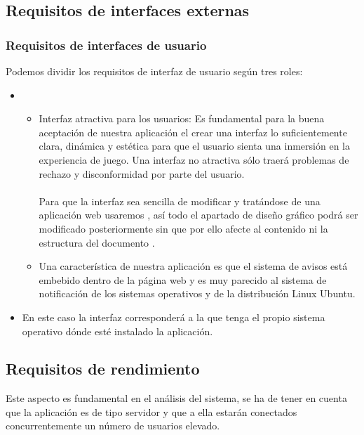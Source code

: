 \subsection{Requisitos de interfaces externas}
\subsubsection{Requisitos de interfaces de usuario}
Podemos dividir los requisitos de interfaz de usuario según tres roles:

\begin{itemize}
\item {}
  \begin{itemize}
  \item Interfaz atractiva para los usuarios: Es fundamental para la buena
    aceptación de nuestra aplicación el crear una interfaz lo suficientemente
    clara, dinámica y estética para que el usuario sienta una inmersión en la
    experiencia de juego. Una interfaz no atractiva sólo traerá problemas de
    rechazo y disconformidad por parte del usuario.\\\\
    Para que la interfaz sea sencilla de modificar y tratándose de una
    aplicación web usaremos , así todo el apartado
    de diseño gráfico podrá ser modificado posteriormente sin que por ello
    afecte al contenido ni la estructura del documento .
  \item Una característica de nuestra aplicación es que el sistema de avisos
    está embebido dentro de la página web y es muy parecido al sistema de
    notificación de los sistemas operativos  y de la \cursiva
    {distribución Linux Ubuntu}.
  \end{itemize}
\item {} En este caso la interfaz corresponderá a la que
  tenga el propio sistema operativo dónde esté instalado la aplicación.
\end{itemize}

\subsection{Requisitos de rendimiento}
Este aspecto es fundamental en el análisis del sistema, se ha de tener en cuenta
que la aplicación es de tipo servidor y que a ella estarán conectados
concurrentemente un número de usuarios elevado.

